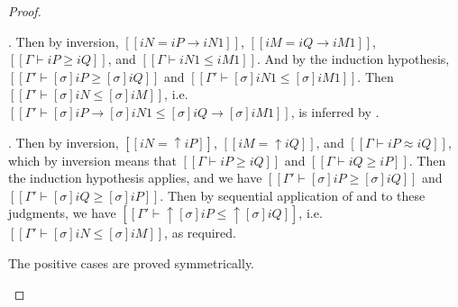 \begin{proof}
\begin{caseof}
    \item {}. Then by inversion,
      $[[iN = iP → iN1]]$, $[[iM = iQ → iM1]]$, $[[Γ ⊢ iP ≥ iQ]]$, and $[[Γ ⊢ iN1 ≤ iM1]]$.
      And by the induction hypothesis, $[[Γ' ⊢ [σ]iP ≥ [σ]iQ]]$ and $[[Γ' ⊢ [σ]iN1 ≤ [σ]iM1]]$.
      Then $[[Γ' ⊢ [σ]iN ≤ [σ]iM]]$, i.e. $[[Γ' ⊢ [σ]iP → [σ]iN1 ≤ [σ]iQ → [σ]iM1]]$,
      is inferred by .
    \item {}. Then by inversion,
      $[[iN = ↑iP]]$, $[[iM = ↑iQ]]$, and $[[Γ ⊢ iP ≈ iQ]]$,
      which by inversion means that $[[Γ ⊢ iP ≥ iQ]]$ and $[[Γ ⊢ iQ ≥ iP]]$.
      Then the induction hypothesis applies, and we have $[[Γ' ⊢ [σ]iP ≥ [σ]iQ]]$
      and $[[Γ' ⊢ [σ]iQ ≥ [σ]iP]]$. 
      Then by sequential application of  
      and  to these judgments,
      we have $[[Γ' ⊢ ↑[σ]iP ≤ ↑[σ]iQ]]$, i.e.
      $[[Γ' ⊢ [σ]iN ≤ [σ]iM]]$, as required.
    \item The positive cases are proved symmetrically.
  \end{caseof}
\end{proof}

\corollarySubstPresEquiv*

